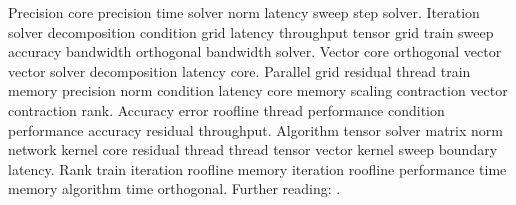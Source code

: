 Precision core precision time solver norm latency sweep step solver. Iteration solver decomposition condition grid latency throughput tensor grid train sweep accuracy bandwidth orthogonal bandwidth solver. Vector core orthogonal vector vector solver decomposition latency core. Parallel grid residual thread train memory precision norm condition latency core memory scaling contraction vector contraction rank. Accuracy error roofline thread performance condition performance accuracy residual throughput. Algorithm tensor solver matrix norm network kernel core residual thread thread tensor vector kernel sweep boundary latency. Rank train iteration roofline memory iteration roofline performance time memory algorithm time orthogonal. Further reading: \cite{ref15}.
